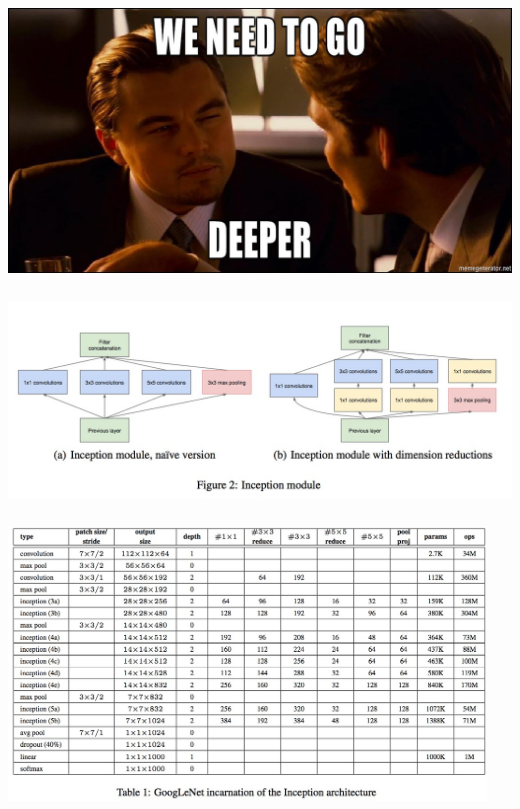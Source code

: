 \documentclass[xetex,mathserif,serif,aspectratio=169]{beamer}
\begin{document}
\begin{frame}[fragile] \frametitle{} \oldB \small

\begin{center}
\includegraphics[width=1.0\textwidth]{img/we-need-to-go-deeper.jpg}
\end{center}

\end{frame}


\begin{frame}[fragile] \frametitle{} \oldB \small

\begin{center}
\includegraphics[width=\textwidth]{img/googLeNetInception.jpg}
\end{center}

\end{frame}

\begin{frame}[fragile] \frametitle{} \oldB \small

\begin{center}
\includegraphics[width=0.95\textwidth]{img/googLeNetModel.jpg}
\end{center}

\end{frame}
\end{document}
